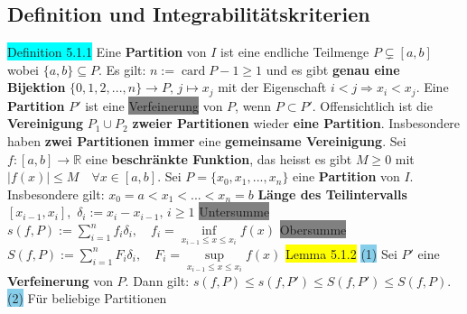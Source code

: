\documentclass[landscape, 10pt]{article}
\newcommand{\R}{\mathbb{R}}
\begin{document}
\begin{multicols}{3}
\subsection{Definition und Integrabilitätskriterien}
\colorbox{cyan}{Definition 5.1.1} Eine \textbf{Partition} von \textcolor{NavyBlue}{$I$} 
                ist eine endliche Teilmenge \textcolor{NavyBlue}{$P\subsetneq[a,b]$} 
                wobei \textcolor{NavyBlue}{$\{a,b\}\subseteq P$}. 
                Es gilt: 
         \textcolor{NavyBlue}{$n:=\operatorname{card} P-1\geqslant1$} und es gibt 
                \textbf{genau eine Bijektion} 
                \textcolor{NavyBlue}{$\{0,1,2,...,n\}\longrightarrow P,\,j\mapsto x_j$}
                mit der Eigenschaft 
         \textcolor{NavyBlue}{$i<j\Longrightarrow x_i<x_j$}.
Eine \textbf{Partition} \textcolor{NavyBlue}{$P'$ }ist eine 
                \colorbox{gray}{Verfeinerung} von \textcolor{NavyBlue}{$P$}, 
                wenn \textcolor{NavyBlue}{$P\subset P'$}. 
                Offensichtlich ist die \textbf{Vereinigung} 
                \textcolor{NavyBlue}{$P_1\cup P_2$} \textbf{zweier Partitionen} 
                wieder \textbf{eine Partition}. Insbesondere 
                haben \textbf{zwei Partitionen immer} 
                eine \textbf{gemeinsame Vereinigung}.
Sei \textcolor{NavyBlue}{$f:[a,b]\longrightarrow\R$} eine \textbf{beschränkte Funktion}, 
                das heisst es gibt 
                \textcolor{NavyBlue}{$M\geqslant0$} mit 
                \textcolor{NavyBlue}{$|f(x)|\leqslant M\quad\forall x\in[a,b]$}. 
Sei \textcolor{NavyBlue}{$P=\{x_0,x_1,...,x_n\}$} eine \textbf{Partition} von 
                \textcolor{NavyBlue}{$I$}. Insbesondere gilt: 
                \textcolor{NavyBlue}{$x_0=a<x_1<...<x_n=b$}
\textbf{Länge des Teilintervalls} 
                \textcolor{NavyBlue}{$[x_{i-1},x_i]$},\,
                \textcolor{NavyBlue}{$\delta_i:=x_i-x_{i-1},\,i\geqslant1$}
\colorbox{gray}{Untersumme} 
                \textcolor{NavyBlue}{$s(f,P):=\sum_{i=1}^nf_i\delta_i,\quad 
                f_i=\inf\limits_{x_{i-1}\leqslant x\leqslant x_i}f(x)$} 
\colorbox{gray}{Obersumme} 
                \textcolor{NavyBlue}{$S(f,P):=\sum_{i=1}^nF_i\delta_i,\quad 
                F_i=\sup\limits_{x_{i-1}\leqslant x\leqslant x_i}f(x)$}
\colorbox{yellow}{Lemma 5.1.2} \colorbox{SkyBlue}{(1)} Sei \textcolor{NavyBlue}{$P'$}
                eine \textbf{Verfeinerung} von \textcolor{NavyBlue}{$P$}. Dann gilt: 
                \textcolor{NavyBlue}{
                $s(f,P)\leqslant s(f,P')\leqslant S(f,P')\leqslant S(f,P)$}.
         \colorbox{SkyBlue}{(2)} Für beliebige Partitionen 

\end{multicols}
\end{document}
